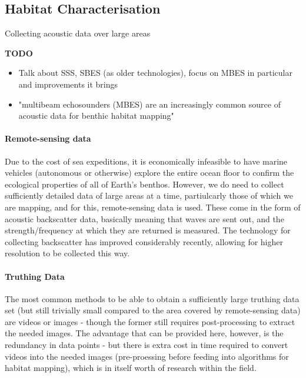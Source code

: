 \documentclass[12pt]{article}
\begin{document}
\begin{multicols}{2}
            \subsection{Habitat Characterisation}
            Collecting acoustic data over large areas 

            \textbf{TODO} 
            \begin{itemize}
                \item Talk about SSS, SBES (as older technologies), focus on MBES in particular and improvements it brings
                \item "multibeam echosounders (MBES) are an increasingly common source of acoustic data for benthic habitat mapping" \cite{calvert15}
            \end{itemize}

            \paragraph{Remote-sensing data}
            Due to the cost of sea expeditions, it is economically infeasible to have marine vehicles (autonomous or otherwise) explore the entire ocean floor to confirm the ecological properties of all of Earth's benthos. However, we do need to collect sufficiently detailed data of large areas at a time, partiulcarly those of which we are mapping, and for this, remote-sensing data is used. These come in the form of acoustic backscatter data, basically meaning that waves are sent out, and the strength/frequency at which they are returned is measured. The technology for collecting backscatter has improved considerably recently, allowing for higher resolution to be collected this way.
            \\

            \paragraph{Truthing Data}
            The most common methods to be able to obtain a sufficiently large truthing data set (but still trivially small compared to the area covered by remote-sensing data) are videos or images - though the former still requires post-processing to extract the needed images. The advantage that can be provided here, however, is the redundancy in data points \cite{rattray14}  - but there is extra cost in time required to convert videos into the needed images (pre-proessing before feeding into algorithms for habitat mapping), which is in itself worth of research within the field.\cite{lucieer13}


\end{multicols}
\end{document}
